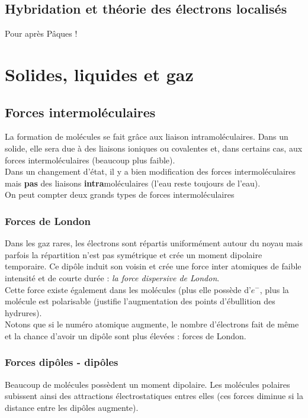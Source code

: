 \documentclass[british,french,11pt, a4paper, openany]{book}
\begin{document}
	
	\section{Hybridation et théorie des électrons localisés}
	Pour après Pâques ! 
	
	\chapter{Solides, liquides et gaz}
	\section{Forces intermoléculaires}
	La formation de molécules se fait grâce aux liaison intramoléculaires. Dans un solide, elle sera due à des liaisons ioniques ou covalentes et, dans certains cas, aux forces intermoléculaires (beaucoup plus faible).\\
	
	Dans un changement d'état, il y a bien modification des forces intermoléculaires mais \textbf{pas} des liaisons \textbf{intra}moléculaires (l'eau reste toujours de l'eau).\\
	On peut compter deux grands types de forces intermoléculaires
	\subsection*{Forces de London}
	Dans les gaz rares, les électrons sont répartis uniformément autour du noyau mais parfois la répartition n'est pas symétrique et crée un moment dipolaire temporaire. Ce dipôle induit son voisin et crée une force inter atomiques de faible intensité et de courte durée : \textit{la force dispersive de London}.\\
	
	Cette force existe également dans les molécules (plus elle possède d'$e^-$, plus la molécule est polarisable (justifie l'augmentation des points d'ébullition des hydrures).\\
	Notons que si le numéro atomique augmente, le nombre d'électrons fait de même et la chance d'avoir un dipôle sont plus élevées : forces de London.
	
	\subsection*{Forces dipôles - dipôles}
	Beaucoup de molécules possèdent un moment dipolaire. Les molécules polaires subissent ainsi des attractions électrostatiques entres elles (ces forces diminue si la distance entre les dipôles augmente).\\
	
\end{document}
